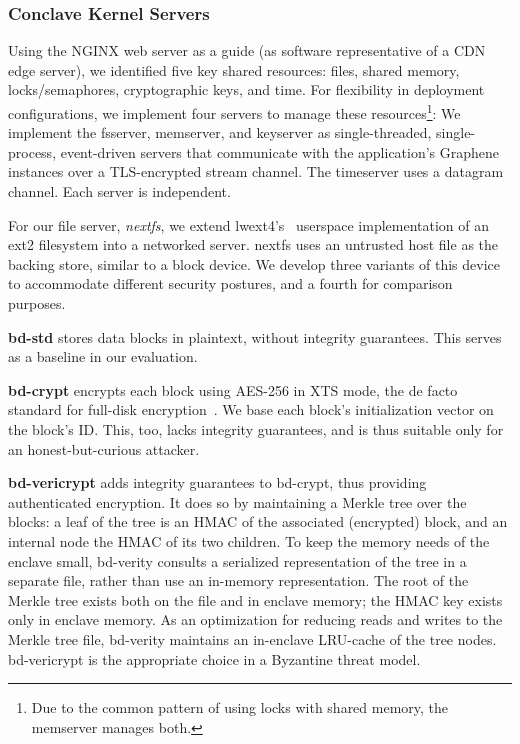 \subsubsection{Conclave Kernel Servers}

Using the NGINX web server as a guide (as software representative of a
CDN edge server), we identified five key shared resources: files,
shared memory, locks/semaphores, cryptographic keys, and time.  
%
For flexibility in deployment configurations, we implement four servers
to manage these resources\footnote{Due to the common pattern of using
locks with shared memory, the memserver manages both.}:
%
We implement the fsserver, memserver, and keyserver as single-threaded,
single-process, event-driven servers that communicate with the application's
Graphene instances over a TLS-encrypted stream channel. 
%
The timeserver uses a datagram channel.
%
Each server is independent.


%
For our file server, \emph{nextfs}, we extend lwext4's~\cite{lwext4} userspace
implementation of an ext2 filesystem into a networked server.
%
nextfs uses an untrusted host file as the backing store, similar to a block
device.
%
We develop three variants of this device to accommodate different security
postures, and a fourth for comparison purposes.

\vspace*{-0.5\baselineskip}
\begin{widelist}

\item 
%
\textbf{bd-std} stores data blocks in plaintext, without integrity
guarantees. This serves as a baseline in our evaluation.


\item
%
\textbf{bd-crypt} encrypts each block using AES-256 in XTS mode, the de
	facto standard for full-disk encryption~\cite{xts-ieee,xts-nist}.
%
We base each block's initialization vector on the block's ID.
%
This, too, lacks integrity guarantees, and is thus suitable only for an
	honest-but-curious attacker.


\item
%
\textbf{bd-vericrypt} adds integrity guarantees to bd-crypt, thus
	providing authenticated encryption.  It does so by maintaining a
	Merkle tree over the blocks: a leaf of the tree is an HMAC of the
	associated (encrypted) block, and an internal node the HMAC of its
	two children.
%
To keep the memory needs of the enclave small, bd-verity consults a
	serialized representation of the tree in a separate file, rather
	than use an in-memory representation.
%
The root of the Merkle tree exists both on the file and in enclave
	memory; the HMAC key exists only in enclave memory.
%
As an optimization for reducing reads and writes to the Merkle tree
	file, bd-verity maintains an in-enclave LRU-cache of the tree
	nodes.
	bd-vericrypt is the appropriate choice in a Byzantine threat model.
	

\end{widelist}


